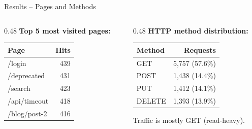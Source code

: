 \documentclass[aspectratio=169, 11pt]{beamer}
\begin{document}
\begin{frame}{Results -- Pages and Methods}
  \begin{columns}[T]
    \begin{column}{0.48\textwidth}
      \textbf{Top 5 most visited pages:}
      \vspace{0.3em}
      \begin{table}
        \centering
        \begin{tabular}{lr}
          \toprule
          \textbf{Page} & \textbf{Hits} \\
          \midrule
          /login & 439 \\
          /deprecated & 431 \\
          /search & 423 \\
          /api/timeout & 418 \\
          /blog/post-2 & 416 \\
          \bottomrule
        \end{tabular}
      \end{table}
    \end{column}
    \begin{column}{0.48\textwidth}
      \textbf{HTTP method distribution:}
      \vspace{0.3em}
      \begin{table}
        \centering
        \begin{tabular}{lr}
          \toprule
          \textbf{Method} & \textbf{Requests} \\
          \midrule
          GET & 5,757 (57.6\%) \\
          POST & 1,438 (14.4\%) \\
          PUT & 1,412 (14.1\%) \\
          DELETE & 1,393 (13.9\%) \\
          \bottomrule
        \end{tabular}
      \end{table}

      \vspace{0.3em}
      \small
       Traffic is mostly GET (read-heavy).
    \end{column}
  \end{columns}
\end{frame}
\end{document}
